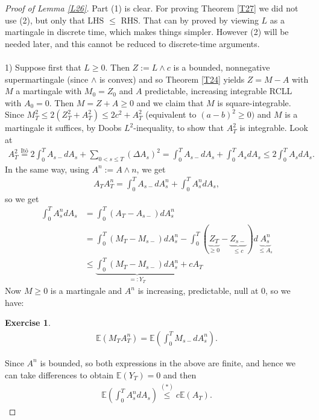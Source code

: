 \documentclass[12pt,a4paper, twoside]{article}
\newtheorem{exe}{Exercise}[section]
\theoremstyle{definition}
\newcommand{\EE}{\mathbb{E}} %
\begin{document}
\begin{proof}[Proof of Lemma \ref{L26}] Part (1) is clear. For proving Theorem \ref{T27} we did not use (2), but only that LHS $\leq$ RHS. That can by proved by viewing $L$ as a martingale in discrete time, which makes things simpler. However (2) will be needed later, and this cannot be reduced to discrete-time arguments.
\\
\\
1) Suppose first that $L \geq 0$. Then $Z:= L \wedge c$ is a bounded, nonnegative supermartingale (since $\wedge$ is convex) and so Theorem \ref{T24} yields $Z=M-A$ with $M$ a martingale with $M_0=Z_0$ and $A$ predictable, increasing integrable RCLL with $A_0=0$. Then $M=Z+A \geq 0$ and we claim that $M$ is square-integrable. Since $M_T^2 \leq 2(Z_T^2 + A_T^2) \leq 2c^2 + A_T^2$ (equivalent to $(a-b)^2 \geq 0)$ and $M$ is a martingale it suffices, by Doobs $L^2$-inequality, to show that $A_T^2$ is integrable. 
\newpage
\noindent Look at 
\begin{align*}
A_T^2 \overset{\text{Itô}} = 2 \int_0^T A_{s-} dA_s + \sum_{0 < s \leq T} ( \Delta A_s)^2 = \int_0^T A_{s-} dA_s + \int_0^T A_s dA_s \leq 2 \int_0 ^T A_sdA_s.
\end{align*}
In the same way, using $A^n:= A \wedge n$, we get 
\begin{align*}
A_TA_T^n = \int_0 ^T A_{s-} dA_s^n + \int_0^T A_s^n dA_s,
\end{align*}
so we get  
\begin{align*}
\int_0^T A_s^n dA_s &= \int_0^T(A_T-A_{s-})dA_s^n \\
&= \int_0^T ( M_T-M_{s-}) dA_s^n- \int_0^T(\underbrace{Z_T}_{ \geq 0}-\underbrace{Z_{s-}}_{ \leq c})d\underbrace{A_s^n}_{\leq A_s}  \\
& \leq \underbrace{\int_0^T (M_T-M_{s-}) dA_s^n}_{=:Y_T} + cA_T \tag{*}
\end{align*}
Now $M \geq 0$ is a martingale and $A^n$ is increasing, predictable, null at $0$, so we have:
\begin{exe} 
\begin{align*}
\EE(M_TA_T^n)= \EE \left( \int_0^T M_{s-} dA_s^n \right). 
\end{align*}
\end{exe}
Since $A^n$ is bounded, so both expressions in the above are finite, and hence we can take differences to obtain $\mathbb{E}(Y_T)=0$ and then 
\begin{align*}
\EE \left( \int_0^T A_s^n dA_s \right) \overset{(*)}\leq c \EE(A_T).
\end{align*}

\end{proof}
\end{document}

